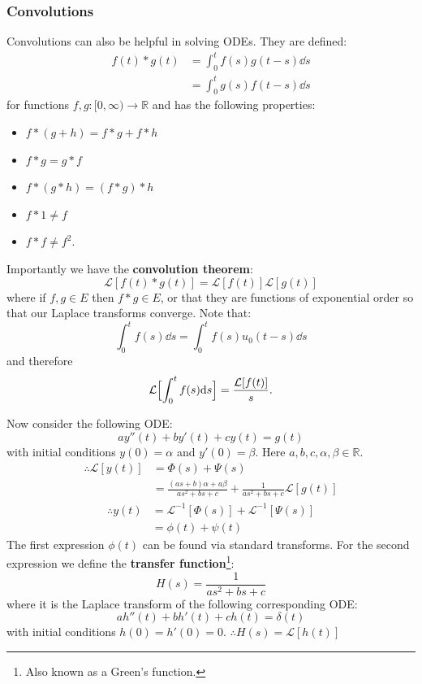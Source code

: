 \documentclass{article}
\begin{document}
\begin{multicols}{3}
\subsubsection{Convolutions}
Convolutions can also be helpful in solving ODEs.
They are defined:
\begin{align*}
    f(t)*g(t)
    &=\int_{0}^{t}f(s)g(t-s)\dd s \\
    &=\int_{0}^{t}g(s)f(t-s)\dd s
\end{align*}
for functions $f,g:[0,\infty)\rightarrow\mathbb{R}$
and has the following properties:
\begin{itemize}
    \item $f*(g+h)=f*g+f*h$
    \item $f*g=g*f$
    \item $f*(g*h)=(f*g)*h$
    \item $f*1\neq f$
    \item $f*f\neq f^2$.
\end{itemize}
Importantly we have the \textbf{convolution theorem}:
$$\mathcal{L}[f(t)*g(t)]=\mathcal{L}[f(t)]\mathcal{L}[g(t)]$$
where if $f,g\in E$ then $f*g\in E$, or that they
are functions of exponential order so that our Laplace
transforms converge. Note that:
$$\int_{0}^{t}f(s)\dd s
=\int_{0}^{t}f(s)u_0(t-s)\dd s$$
and therefore
$$\mathcal{L}\Bigl[
\int_{0}^{t}f(s)\dd s
\Bigr]=\frac{\mathcal{L}[f(t)]}{s}.$$

Now consider the following ODE:
$$ay''(t)+by'(t)+cy(t)=g(t)$$
with initial conditions $y(0)=\alpha$
and $y'(0)=\beta$.
Here $a,b,c,\alpha,\beta\in\mathbb{R}$.
\begin{align*}
    \therefore\mathcal{L}[y(t)]
    &=\Phi(s)+\Psi(s) \\
    &=\frac{(as+b)\alpha+a\beta}
    {as^2+bs+c}
    +\frac{1}{as^2+bs+c}\mathcal{L}[g(t)]
\end{align*}
\begin{align*}
    \therefore y(t)
    &=\mathcal{L}^{-1}[\Phi(s)]
    +\mathcal{L}^{-1}[\Psi(s)] \\
    &=\phi(t)+\psi(t)
\end{align*}
The first expression $\phi(t)$ can be found via
standard transforms.
For the second expression we define the
\textbf{transfer function}\footnote{Also known as a Green's function.}:
$$H(s)=\frac{1}{as^2+bs+c}$$
where it is the Laplace transform of the following
corresponding ODE:
$$ah''(t)+bh'(t)+ch(t)=\delta(t)$$
with initial conditions $h(0)=h'(0)=0$.
$\therefore H(s)=\mathcal{L}[h(t)]$


\end{multicols}
\end{document}
